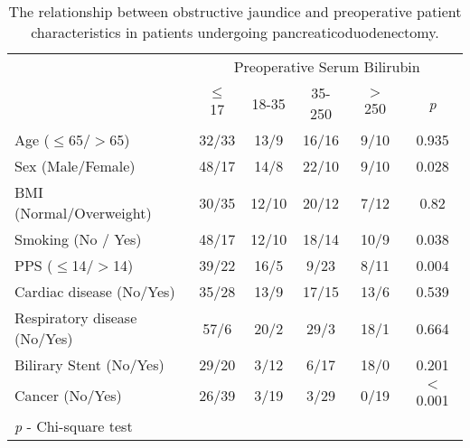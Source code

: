 \begin{table}[p]

\caption{The relationship  between obstructive jaundice and preoperative patient characteristics in patients undergoing pancreaticoduodenectomy.}
\label{table:cpet_oj_patient}

\centering\renewcommand{\arraystretch}{1.4} %
\setlength{\tabcolsep}{9pt} %


	\begin{tabular}{| l | c c c c c |}
		\hline
		                             & \multicolumn{5}{c|}{Preoperative Serum Bilirubin} \\
		                             & $\leq$ 17 & 18-35 & 35-250 & $>$ 250 & \textit{p}         \\ \hline
		Age ($\leq$65/$>$65)         & 32/33     & 13/9  & 16/16  & 9/10    & 0.935     \\
		Sex (Male/Female)            & 48/17     & 14/8  & 22/10  & 9/10    & 0.028     \\
		BMI (Normal/Overweight)      & 30/35     & 12/10 & 20/12  & 7/12    & 0.82      \\
		Smoking (No / Yes)           & 48/17     & 12/10 & 18/14  & 10/9    & 0.038     \\
		PPS ($\leq$14/$>$14)         & 39/22     & 16/5  & 9/23   & 8/11    & 0.004     \\
		Cardiac disease (No/Yes)     & 35/28     & 13/9  & 17/15  & 13/6    & 0.539     \\
		Respiratory disease (No/Yes) & 57/6      & 20/2  & 29/3   & 18/1    & 0.664     \\
		Bilirary Stent (No/Yes)      & 29/20     & 3/12  & 6/17   & 18/0    & 0.201     \\
		Cancer (No/Yes)              & 26/39     & 3/19  & 3/29   & 0/19    & $<$0.001  \\ \hline
		\multicolumn{6}{l}{\textit{p} - Chi-square test}
	\end{tabular}

\end{table}